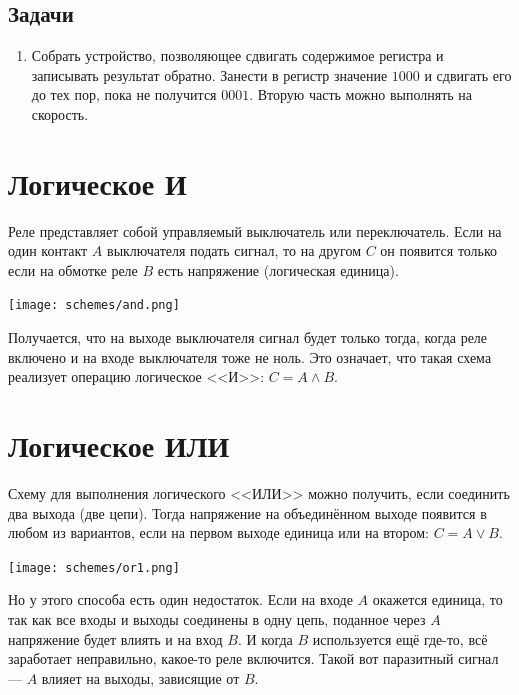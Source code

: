 \subsection{Задачи}

\begin{enumerate}
    \item Собрать устройство, позволяющее сдвигать содержимое регистра и записывать результат обратно.
          Занести в регистр значение $1000$ и сдвигать его до тех пор, пока не получится $0001$.
          Вторую часть можно выполнять на скорость.
\end{enumerate}


\section{Логическое И}

Реле представляет собой управляемый выключатель или переключатель.
Если на один контакт $A$ выключателя подать сигнал, то на другом $C$ он появится
только если на обмотке реле $B$ есть напряжение (логическая единица).

\begin{center}
\texttt{[image: schemes/and.png]}
\end{center}

Получается, что на выходе выключателя сигнал будет только тогда, когда
реле включено и на входе выключателя тоже не ноль. Это означает, что такая
схема реализует операцию логическое <<И>>: $C = A \land B$.



\section{Логическое ИЛИ}


Схему для выполнения логического <<ИЛИ>> можно получить, если соединить два выхода
(две цепи). Тогда напряжение на объединённом выходе появится в любом
из вариантов, если на первом выходе единица или на втором: $C = A \lor B$.

\begin{center}
\texttt{[image: schemes/or1.png]}
\end{center}

Но у этого способа есть один недостаток. Если на входе $A$ окажется единица,
то так как все входы и выходы соединены в одну цепь, поданное через $A$ напряжение
будет влиять и на вход $B$. И когда $B$ используется ещё где-то,
всё заработает неправильно, какое-то реле включится.
Такой вот паразитный сигнал --- $A$ влияет на выходы, зависящие от $B$.

